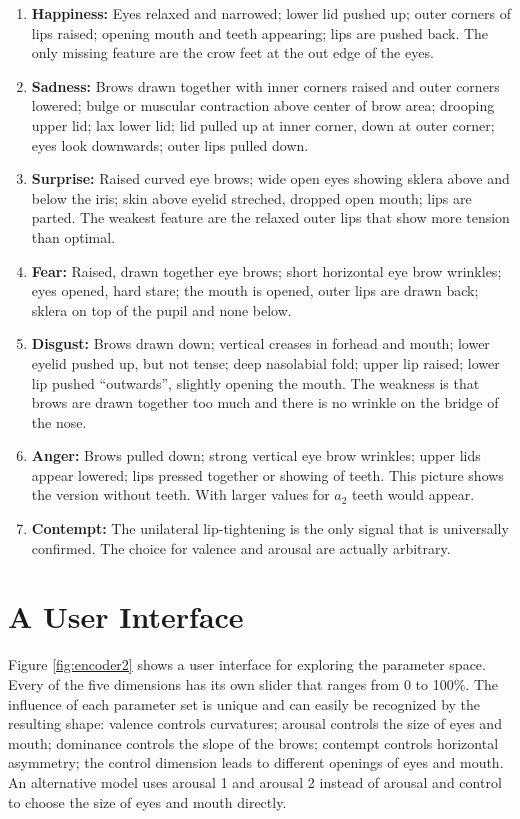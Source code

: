 \documentclass[conference]{IEEEtran}
\begin{document}
\begin{enumerate}
    \item {\bf Happiness:}
    Eyes relaxed and narrowed; lower lid pushed up; outer corners of lips raised; opening mouth and teeth
    appearing; lips are pushed back. The only missing feature are the crow feet at the out edge of the eyes.
    \item {\bf Sadness:}
    Brows drawn together with inner corners raised and outer corners lowered; bulge or muscular
    contraction above center of brow area; drooping upper lid; lax lower lid; lid pulled up at inner corner,
    down at outer corner; eyes look downwards; outer lips pulled down.
    \item {\bf Surprise:}
    Raised curved eye brows; wide open eyes showing sklera above and below the iris; skin above eyelid streched,
    dropped open mouth; lips are parted.
    The weakest feature are the relaxed outer lips that show more tension than optimal.
    \item {\bf Fear:}
    Raised, drawn together eye brows; short horizontal eye brow wrinkles; eyes opened,
    hard stare; the mouth is opened, outer lips are drawn back; sklera on top of the pupil and none below.
    \item {\bf Disgust:}
    Brows drawn down; vertical creases in forhead and mouth; lower eyelid pushed up, but not tense;
    deep nasolabial fold; upper lip raised; lower lip pushed ``outwards'', slightly opening the mouth.
    The weakness is that brows are drawn together too much and there is no wrinkle on the bridge of the nose.
    \item {\bf Anger:}
    Brows pulled down; strong vertical eye brow wrinkles; upper lids appear lowered; lips pressed together
    or showing of teeth. This picture shows the version without teeth. With larger values for $a_2$ teeth would
    appear.
    \item {\bf Contempt:}
    The unilateral lip-tightening is the only signal that is universally confirmed. The choice for valence and arousal
    are actually arbitrary.
\end{enumerate}

\section{A User Interface}

Figure \ref{fig:encoder2} shows a user interface for exploring the parameter space.
Every of the five dimensions has its own slider that ranges from 0 to 100\%. The
influence of each parameter set is unique and can easily be recognized by the resulting shape:
valence controls curvatures; arousal controls the size of eyes and mouth; dominance controls
the slope of the brows; contempt controls horizontal asymmetry; the control dimension leads to
different openings of eyes and mouth. An alternative model uses arousal 1 and arousal 2 instead of
arousal and control to choose the size of eyes and mouth directly.
\end{document}
